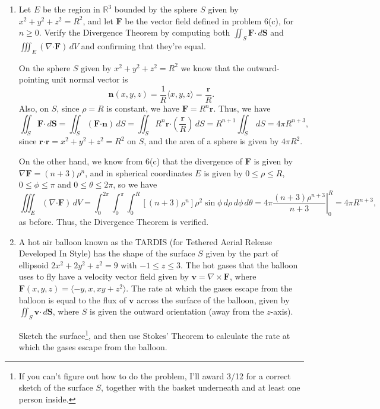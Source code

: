 \documentclass[12pt]{article}
\newcommand{\points}[1]{\marginpar{\hspace{24pt}[#1]}}
\newcommand{\R}{\mathbb{R}}
\renewcommand{\S}{\mathbf{S}}
\renewcommand{\r}{\mathbf{r}}
\newcommand{\dotp}{\boldsymbol{\cdot}}
\newcommand{\di}{\displaystyle}
\newcommand{\F}{\mathbf{F}}
\newcommand{\n}{\mathbf{n}}
\begin{document}
\begin{enumerate}
\newpage

\item Let $E$ be the region in $\R^3$ bounded by the sphere $S$ given by $x^2+y^2+z^2=R^2$, and let $\F$ be the vector field defined in problem 6(c), for $n\geq 0$. 
Verify the Divergence Theorem by computing both $\iint_S \F\dotp\,d\S$ and $\iiint_E (\nabla\dotp\F)\,dV$ and confirming that they're equal. \points{12}

\bigskip

On the sphere $S$ given by $x^2+y^2+z^2=R^2$ we know that the outward-pointing unit normal vector is 
\[
\n(x,y,z) = \frac{1}{R}\langle x,y,z\rangle = \frac{\r}{R}.
\]
Also, on $S$, since $\rho=R$ is constant, we have $\F = R^n\r$. Thus, we have
\[
\iint_S\F\dotp\,d\S = \iint_S (\F\dotp \n)\,dS = \iint_S R^n\r\dotp\left(\frac{\r}{R}\right)\,dS = R^{n+1}\iint_S\,dS = 4\pi R^{n+3},
\]
since $\r\dotp\r = x^2+y^2+z^2=R^2$ on $S$, and the area of a sphere is given by $4\pi R^2$.

\bigskip

On the other hand, we know from 6(c) that the divergence of $\F$ is given by $\nabla \F = (n+3)\rho^n$, and in spherical coordinates $E$ is given by $0\leq \rho\leq R$, $0\leq \phi\leq \pi$ and $0\leq \theta\leq 2\pi$, so we have
\[
\iiint_E (\nabla\dotp\F)\,dV = \int_0^{2\pi}\int_0^\pi\int_0^R [(n+3)\rho^n]\rho^2\sin\phi\,d\rho\,d\phi\,d\theta = 4\pi \left.\frac{(n+3)\rho^{n+3}}{n+3}\right|_0^R = 4\pi R^{n+3},
\]
as before. Thus, the Divergence Theorem is verified.

\newpage

\item A hot air balloon known as the TARDIS (for Tethered Aerial Release Developed In Style) has the shape of the surface $S$ given by the part of ellipsoid $2x^2+2y^2+z^2=9$ with $-1\leq z\leq 3$. The hot gases that the balloon uses to fly have a velocity vector field given by $\mathbf{v} = \nabla\times \F$, where $\F(x,y,z) = \langle -y, x, xy+z^2\rangle$. The rate at which the gases escape from the balloon is equal to the flux of $\mathbf{v}$ across the surface of the balloon, given by $\di \iint_S \mathbf{v}\dotp\,d\S$, where $S$ is given the outward orientation (away from the $z$-axis). 
 
Sketch the surface\footnote{If you can't figure out how to do the problem, I'll award 3/12 for a correct sketch of the surface $S$, together with the basket underneath and at least one person inside.}, and then use Stokes' Theorem to calculate the rate at which the gases escape from the balloon. \points{12}


\end{enumerate}
\end{document}
